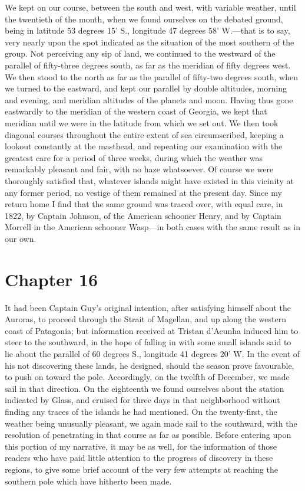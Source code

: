 We kept on our course, between the south and west, with variable weather,
until the twentieth of the month, when we found ourselves on the debated ground,
being in latitude 53 degrees 15' S., longitude 47 degrees 58' W.---that is to
say, very nearly upon the spot indicated as the situation of the most southern
of the group. Not perceiving any sip of land, we continued to the westward of
the parallel of fifty-three degrees south, as far as the meridian of fifty
degrees west. We then stood to the north as far as the parallel of fifty-two
degrees south, when we turned to the eastward, and kept our parallel by double
altitudes, morning and evening, and meridian altitudes of the planets and moon.
Having thus gone eastwardly to the meridian of the western coast of Georgia, we
kept that meridian until we were in the latitude from which we set out. We then
took diagonal courses throughout the entire extent of sea circumscribed, keeping
a lookout constantly at the masthead, and repeating our examination with the
greatest care for a period of three weeks, during which the weather was
remarkably pleasant and fair, with no haze whatsoever. Of course we were
thoroughly satisfied that, whatever islands might have existed in this vicinity
at any former period, no vestige of them remained at the present day. Since my
return home I find that the same ground was traced over, with equal care, in
1822, by Captain Johnson, of the American schooner Henry, and by Captain Morrell
in the American schooner Wasp---in both cases with the same result as in our
own. 


\section{Chapter 16}
It had been Captain Guy's original intention, after satisfying himself about
the Auroras, to proceed through the Strait of Magellan, and up along the western
coast of Patagonia; but information received at Tristan d'Acunha induced him to
steer to the southward, in the hope of falling in with some small islands said
to lie about the parallel of 60 degrees S., longitude 41 degrees 20' W. In the
event of his not discovering these lands, he designed, should the season prove
favourable, to push on toward the pole. Accordingly, on the twelfth of December,
we made sail in that direction. On the eighteenth we found ourselves about the
station indicated by Glass, and cruised for three days in that neighborhood
without finding any traces of the islands he had mentioned. On the twenty-first,
the weather being unusually pleasant, we again made sail to the southward, with
the resolution of penetrating in that course as far as possible. Before entering
upon this portion of my narrative, it may be as well, for the information of
those readers who have paid little attention to the progress of discovery in
these regions, to give some brief account of the very few attempts at reaching
the southern pole which have hitherto been made. 


